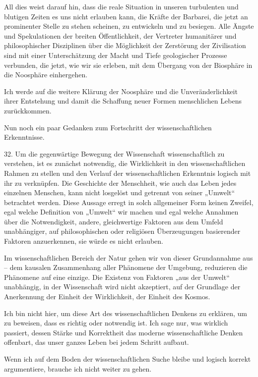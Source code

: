\documentclass[11pt,a4paper]{book}
\begin{document}
All dies weist darauf hin, dass die reale Situation in unseren turbulenten und blutigen Zeiten es uns nicht erlauben kann, die Kräfte der Barbarei, die jetzt an prominenter Stelle zu stehen scheinen, zu entwickeln und zu besiegen. Alle Ängste und Spekulationen der breiten Öffentlichkeit, der Vertreter humanitärer und philosophischer Disziplinen über die Möglichkeit der Zerstörung der Zivilisation sind mit einer Unterschätzung der Macht und Tiefe geologischer Prozesse verbunden, die jetzt, wie wir sie erleben, mit dem Übergang von der Biosphäre in die Noosphäre einhergehen. 

Ich werde auf die weitere Klärung der Noosphäre und die Unveränderlichkeit ihrer Entstehung und damit die Schaffung neuer Formen menschlichen Lebens zurückkommen. 

Nun noch ein paar Gedanken zum Fortschritt der wissenschaftlichen Erkenntnisse. 

32. Um die gegenwärtige Bewegung der Wissenschaft wissenschaftlich zu verstehen, ist es zunächst notwendig, die Wirklichkeit in den wissenschaftlichen Rahmen zu stellen und den Verlauf der wissenschaftlichen Erkenntnis logisch mit ihr zu verknüpfen. Die Geschichte der Menschheit, wie auch das Leben jedes einzelnen Menschen, kann nicht losgelöst und getrennt von seiner „Umwelt“ betrachtet werden. Diese Aussage erregt in solch allgemeiner Form keinen Zweifel, egal welche Definition von „Umwelt“ wir machen und egal welche Annahmen über die Notwendigkeit, andere, gleichwertige Faktoren aus dem Umfeld unabhängiger, auf philosophischen oder religiösen Überzeugungen basierender Faktoren anzuerkennen, sie würde es nicht erlauben. 

Im wissenschaftlichen Bereich der Natur gehen wir von dieser Grundannahme aus -- dem kausalen Zusammenhang aller Phänomene der Umgebung, reduzieren die Phänomene auf eine einzige. Die Existenz von Faktoren „aus der Umwelt“ unabhängig, in der Wissenschaft wird nicht akzeptiert, auf der Grundlage der Anerkennung der Einheit der Wirklichkeit, der Einheit des Kosmos. 

Ich bin nicht hier, um diese Art des wissenschaftlichen Denkens zu erklären, um zu beweisen, dass es richtig oder notwendig ist. Ich sage nur, was wirklich passiert, dessen Stärke und Korrektheit das moderne wissenschaftliche Denken offenbart, das unser ganzes Leben bei jedem Schritt aufbaut. 

Wenn ich auf dem Boden der wissenschaftlichen Suche bleibe und logisch korrekt argumentiere, brauche ich nicht weiter zu gehen. 
\end{document}
